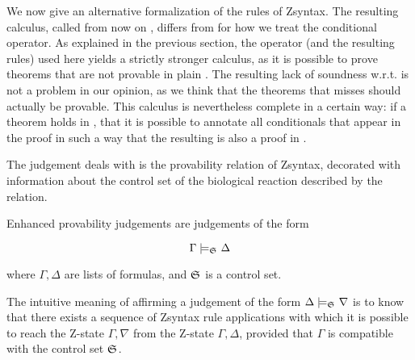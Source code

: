 
We now give an alternative formalization of the rules of Zsyntax. The resulting
calculus, called from now on \eznd{}, differs from \znd{} for how we treat the
conditional operator. As explained in the previous section, the operator (and
the resulting rules) used here yields a strictly stronger calculus, as it is
possible to prove theorems that are not provable in plain \znd{}. The resulting
lack of soundness w.r.t. \znd{} is not a problem in our opinion, as we think
that the theorems that \znd{} misses should actually be provable. This calculus
is nevertheless complete in a certain way: if a theorem holds in \znd{}, that it
is possible to annotate all conditionals that appear in the proof in such a way
that the resulting is also a proof in \eznd{}.

The judgement \eznd{} deals with is the provability relation of Zsyntax,
decorated with information about the control set of the biological reaction
described by the relation.

\begin{definition}
  Enhanced provability judgements are judgements of the form

  \[
    \Gamma \models_{\mathfrak{S}_{}} \Delta
  \]

  where $\Gamma, \Delta$ are lists of formulas, and $\mathfrak{S}_{}$ is a control
  set.
\end{definition}


The intuitive meaning of affirming a judgement of the form
$\Delta \models_{\mathfrak{S}_{}} \nabla$ is to know that there exists a sequence of
Zsyntax rule applications with which it is possible to reach the Z-state
$\Gamma, \nabla$ from the Z-state $\Gamma, \Delta$, provided that $\Gamma$ is
compatible with the control set $\mathfrak{S}_{}$.


